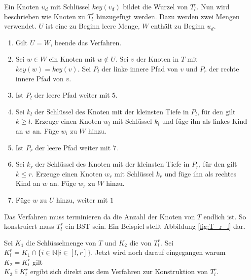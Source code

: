 \documentclass[a4paper,12pt]{article}
\begin{document}
\noindent Ein Knoten $u_d$ mit Schlüssel $\mathit{key}(v_d)$ bildet die Wurzel von $T^r_l$. Nun wird beschrieben wie Knoten zu $T^r_l$ hinzugefügt werden.
Dazu werden zwei Mengen verwendet. $U$ ist eine zu Beginn leere Menge, $W$ enthält zu Beginn $u_d$.
\begin{enumerate}
	\item Gilt $U = W$, beende das Verfahren.
	\item Sei $w \in W$ ein Knoten mit $w \notin U$.  Sei $v$ der Knoten in $T$ mit $\mathit{key}(w ) = \mathit{key}(v)$. Sei $P_l$ der linke innere Pfad von $v$ und $P_r$ der rechte innere Pfad von $v$.
	\item Ist $P_l$ der leere Pfad weiter mit $5$.
	\item Sei $k_l$ der Schlüssel des Knoten mit der kleinsten Tiefe in $P_l$, für den gilt $k \geq l$. Erzeuge einen Knoten $w_l$ mit Schlüssel $k_l$ und füge ihn als linkes Kind an $w$ an. Füge $w_l$ zu $W$ hinzu.
	\item Ist $P_r$ der leere Pfad weiter mit $7$.
	\item Sei $k_r$ der Schlüssel des Knoten mit der kleinsten Tiefe in $P_r$, für den gilt  $k \leq r$. Erzeuge einen Knoten $w_r$ mit Schlüssel $k_r$ und füge ihn als rechtes Kind an $w$ an. Füge $w_r$ zu $W$ hinzu.	
	\item Füge $w$ zu $U$ hinzu, weiter mit $1$
\end{enumerate}
Das Verfahren muss terminieren da die Anzahl der Knoten von $T$ endlich ist. So konstruiert muss $T^r_l$ ein BST sein. Ein Beispiel stellt Abbildung \ref{fig:T_r_l} dar. 

 \noindent Sei $K_1$ die Schlüsselmenge von $T$ und $K_2$ die von $T^r_l$. Sei ${K^r_l = K_1 \cap \{i \in \mathbb{N}\vert i \in \left[l,r\right] \}}$. Jetzt wird noch darauf eingegangen warum $K_2 = K^r_l$ gilt \\

 \noindent $K_2 \subseteqq  K^r_l$ ergibt sich direkt aus dem Verfahren zur Konstruktion von $T^r_l$.\\
 
\end{document}
